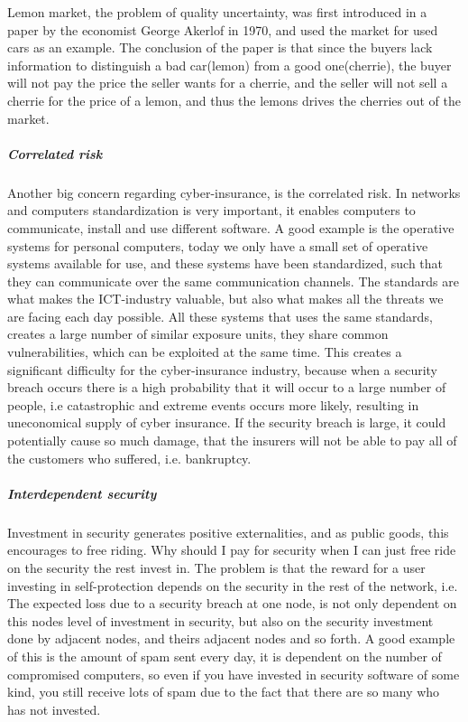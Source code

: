       Lemon market, the problem of quality uncertainty, was first introduced in a paper \cite{lemonpaper} by the economist George Akerlof in 1970,
       and used the market for used cars as an example.\cite{lemon} The conclusion of the paper is
        that since the buyers lack information to distinguish a bad car(lemon) from a good
         one(cherrie), the buyer will not pay the price the seller wants for a cherrie, 
         and the seller will not sell a cherrie for the price of a lemon, 
         and thus the lemons drives the cherries out of the market. 
\subparagraph{Correlated risk}

Another big concern regarding cyber-insurance, is the correlated risk. In networks and computers
 standardization is very important, it enables computers to communicate, 
 install and use different software. A good example is the operative systems for personal computers,
  today we only have a small set of operative systems available for use, and these systems have been
   standardized, such that they can communicate over the same communication channels. The standards are what makes the ICT-industry valuable, 
   but also what makes all the threats we are facing each day possible. 
   All these systems that uses the same standards, creates a large number of similar exposure units,
    they share common vulnerabilities, which can be exploited at the same time. 
This creates a significant difficulty for the cyber-insurance industry, because
when a security breach occurs there is a high probability that it will occur to a large number of people, i.e catastrophic and extreme events occurs more likely, resulting in uneconomical supply of cyber insurance.
If the security breach is large, it could potentially cause so much damage, that the insurers will not be able to pay all of the customers who suffered, i.e. bankruptcy.\cite{bohme2010modeling} 
\subparagraph{Interdependent security}
Investment in security generates positive externalities, and as public goods, this encourages to free riding. Why should I pay for security when I can just free ride on the security the rest invest in.  The problem is that the reward for a user investing in self-protection depends on the security in the rest of the network, i.e. The expected loss due to a security breach at one node, is not only
dependent on this nodes level of investment in security, but also on the security investment done
  by adjacent nodes, and theirs adjacent nodes and so forth. 
  A good example of this is the amount of spam sent every day, it is dependent on the number of compromised computers, so even if you have invested in security software of some kind, you still receive lots of spam due to the fact that there are so many who has not invested. 
  \cite{towardsInsurable}

